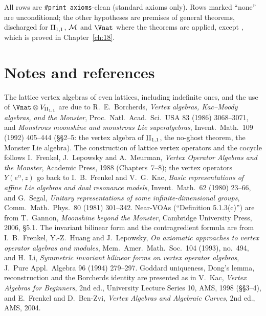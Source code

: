 All rows are \texttt{\#print axioms}-clean (standard axioms only).  Rows marked ``none'' are unconditional; the other
hypotheses are premises of general theorems, discharged for ${\mathrm{II}_{1,1}}$, $\mathcal{M}$ and $\Vnat$ where the theorems are
applied, except , which is proved in Chapter~\ref{ch:18}.

\section{Notes and references}\label{ch17:sec:notes}

The lattice vertex algebras of even lattices, including indefinite ones, and the use of $\Vnat\otimes V_{\chseventeenII}$ are due
to R.~E.~Borcherds, \emph{Vertex algebras, Kac--Moody algebras, and the Monster}, Proc.\ Natl.\ Acad.\ Sci.\ USA 83 (1986)
3068--3071, and \emph{Monstrous moonshine and monstrous Lie superalgebras}, Invent.\ Math.\ 109 (1992) 405--444 (\S\S2--5:
the vertex algebra of ${\mathrm{II}_{1,1}}$, the no-ghost theorem, the Monster Lie algebra).  The construction of lattice vertex
operators and the cocycle follows I.~Frenkel, J.~Lepowsky and A.~Meurman, \emph{Vertex Operator Algebras and the Monster},
Academic Press, 1988 (Chapters~7--8); the vertex operators $Y(e^\alpha,z)$ go back to I.~B.~Frenkel and V.~G.~Kac, \emph{Basic
representations of affine Lie algebras and dual resonance models}, Invent.\ Math.\ 62 (1980) 23--66, and G.~Segal, \emph{Unitary
representations of some infinite-dimensional groups}, Comm.\ Math.\ Phys.\ 80 (1981) 301--342.  Near-VOAs (``Definition
5.1.3(c)'') are from T.~Gannon, \emph{Moonshine beyond the Monster}, Cambridge University Press, 2006, \S5.1.  The invariant
bilinear form and the contragredient formula are from I.~B.~Frenkel, Y.-Z.~Huang and J.~Lepowsky, \emph{On axiomatic
approaches to vertex operator algebras and modules}, Mem.\ Amer.\ Math.\ Soc.\ 104 (1993), no.~494, and H.~Li, \emph{Symmetric
invariant bilinear forms on vertex operator algebras}, J.\ Pure Appl.\ Algebra 96 (1994) 279--297.  Goddard uniqueness,
Dong's lemma, reconstruction and the Borcherds identity are presented as in V.~Kac, \emph{Vertex Algebras for Beginners},
2nd ed., University Lecture Series 10, AMS, 1998 (\S\S3--4), and E.~Frenkel and D.~Ben-Zvi, \emph{Vertex Algebras and Algebraic
Curves}, 2nd ed., AMS, 2004.

